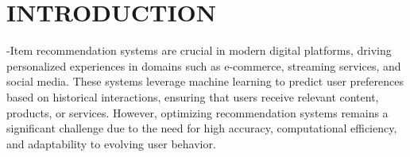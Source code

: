 \documentclass{ieeetj}
\begin{document}


\maketitle

\section{INTRODUCTION}



-Item recommendation systems are crucial in modern digital platforms, driving personalized experiences in domains such as e-commerce, streaming services, and social media. These systems leverage machine learning to predict user preferences based on historical interactions, ensuring that users receive relevant content, products, or services. However, optimizing recommendation systems remains a significant challenge due to the need for high accuracy, computational efficiency, and adaptability to evolving user behavior.
\end{document}
